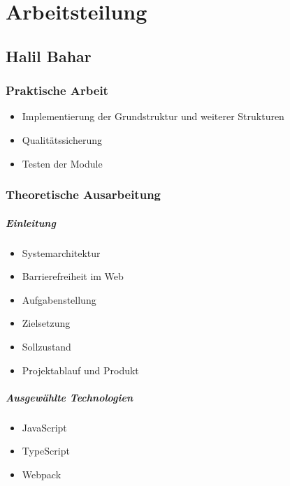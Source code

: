\chapter{Arbeitsteilung}

\section{Halil Bahar}

\subsection{Praktische Arbeit}

\begin{itemize}
	\item Implementierung der Grundstruktur und weiterer Strukturen
	\item Qualitätssicherung
	\item Testen der Module
\end{itemize}

\subsection{Theoretische Ausarbeitung}

\paragraph{Einleitung}

\begin{itemize}
	\item Systemarchitektur
	\item Barrierefreiheit im Web
	\item Aufgabenstellung
	\item Zielsetzung
	\item Sollzustand
	\item Projektablauf und Produkt
\end{itemize}

\paragraph{Ausgewählte Technologien}

\begin{itemize}
	\item JavaScript
	\item TypeScript
	\item Webpack
\end{itemize}

